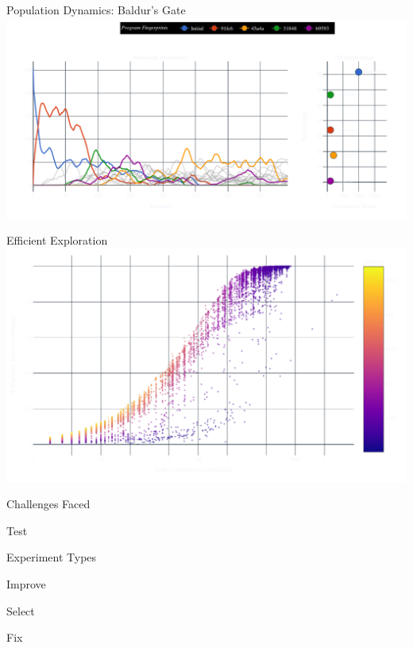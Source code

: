 \documentclass[aspectratio=169]{beamer}
\makeatletter
\renewcommand{\emph}[1]{{\Huge \color{pureminimalistic@text@red} #1}}
\newcommand{\white}[1]{{\color{pureminimalistic@text@white} #1}}
\makeatother
\begin{document}
\begin{frame}{Population Dynamics: Baldur's Gate}
    \includegraphics[width=1.0\linewidth, keepaspectratio]{figures/baldurs_pheno_60.pdf}
\end{frame}

\begin{frame}{Efficient Exploration}
    \centering
    \includegraphics[width=0.85\linewidth, keepaspectratio]{figures/efficient_overview.pdf}
\end{frame}

\begin{frame}{Challenges Faced}
    \begin{vfilleditems}
    \item \Huge Test
    \end{vfilleditems}
\end{frame}

\begin{frame}{\white{Experiment Types}}
    \begin{vfilleditems}
    \item \emph{Improve}
    \item \emph{Select}
    \item \emph{Fix}
    \end{vfilleditems}
\end{frame}
\end{document}

